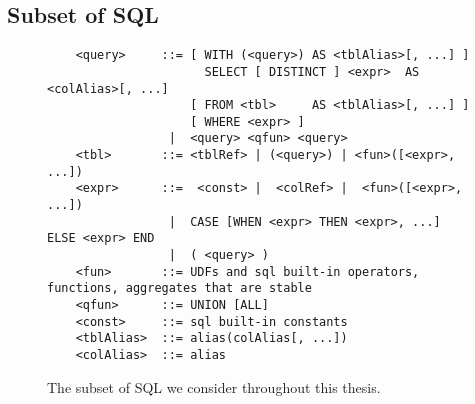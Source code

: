 \subsection{Subset of SQL}
%
%


\begin{figure}[H]
    \begin{verbatim}
    <query>     ::= [ WITH (<query>) AS <tblAlias>[, ...] ]
                      SELECT [ DISTINCT ] <expr>  AS <colAlias>[, ...]
                    [ FROM <tbl>     AS <tblAlias>[, ...] ]
                    [ WHERE <expr> ]
                 |  <query> <qfun> <query>
    <tbl>       ::= <tblRef> | (<query>) | <fun>([<expr>, ...])
    <expr>      ::=  <const> |  <colRef> |  <fun>([<expr>, ...])
                 |  CASE [WHEN <expr> THEN <expr>, ...] ELSE <expr> END
                 |  ( <query> )
    <fun>       ::= UDFs and sql built-in operators, functions, aggregates that are stable
    <qfun>      ::= UNION [ALL]
    <const>     ::= sql built-in constants
    <tblAlias>  ::= alias(colAlias[, ...])
    <colAlias>  ::= alias
    \end{verbatim}
    \caption{The subset of SQL we consider throughout this thesis.}
    \label{lst:sql_grammar}
\end{figure}



